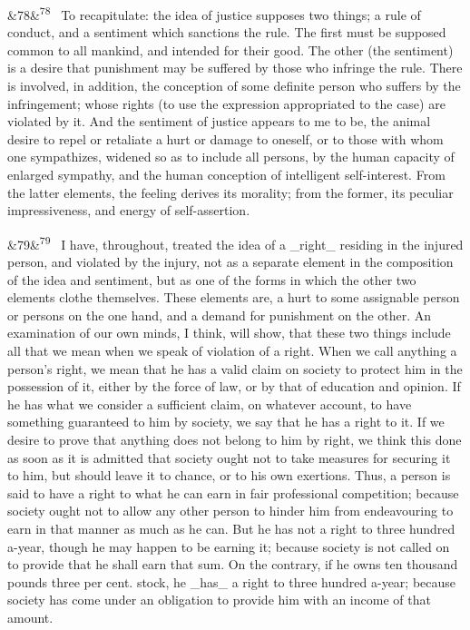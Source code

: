 \documentclass[12pt]{article}
\newcommand{\para}[1][]{\par\noindent\ifx&#1&\else\textsuperscript{\footnotesize #1}~\fi}
\begin{document}
\para[78] To recapitulate: the idea of justice supposes two things; a rule of conduct, and a sentiment which sanctions the rule. The first must be supposed common to all mankind, and intended for their good. The other (the sentiment) is a desire that punishment may be suffered by those who infringe the rule. There is involved, in addition, the conception of some definite person who suffers by the infringement; whose rights (to use the expression appropriated to the case) are violated by it. And the sentiment of justice appears to me to be, the animal desire to repel or retaliate a hurt or damage to oneself, or to those with whom one sympathizes, widened so as to include all persons, by the human capacity of enlarged sympathy, and the human conception of intelligent self-interest. From the latter elements, the feeling derives its morality; from the former, its peculiar impressiveness, and energy of self-assertion.

\para[79] I have, throughout, treated the idea of a \_right\_ residing in the injured person, and violated by the injury, not as a separate element in the composition of the idea and sentiment, but as one of the forms in which the other two elements clothe themselves. These elements are, a hurt to some assignable person or persons on the one hand, and a demand for punishment on the other. An examination of our own minds, I think, will show, that these two things include all that we mean when we speak of violation of a right. When we call anything a person's right, we mean that he has a valid claim on society to protect him in the possession of it, either by the force of law, or by that of education and opinion. If he has what we consider a sufficient claim, on whatever account, to have something guaranteed to him by society, we say that he has a right to it. If we desire to prove that anything does not belong to him by right, we think this done as soon as it is admitted that society ought not to take measures for securing it to him, but should leave it to chance, or to his own exertions. Thus, a person is said to have a right to what he can earn in fair professional competition; because society ought not to allow any other person to hinder him from endeavouring to earn in that manner as much as he can. But he has not a right to three hundred a-year, though he may happen to be earning it; because society is not called on to provide that he shall earn that sum. On the contrary, if he owns ten thousand pounds three per cent. stock, he \_has\_ a right to three hundred a-year; because society has come under an obligation to provide him with an income of that amount.
\end{document}
